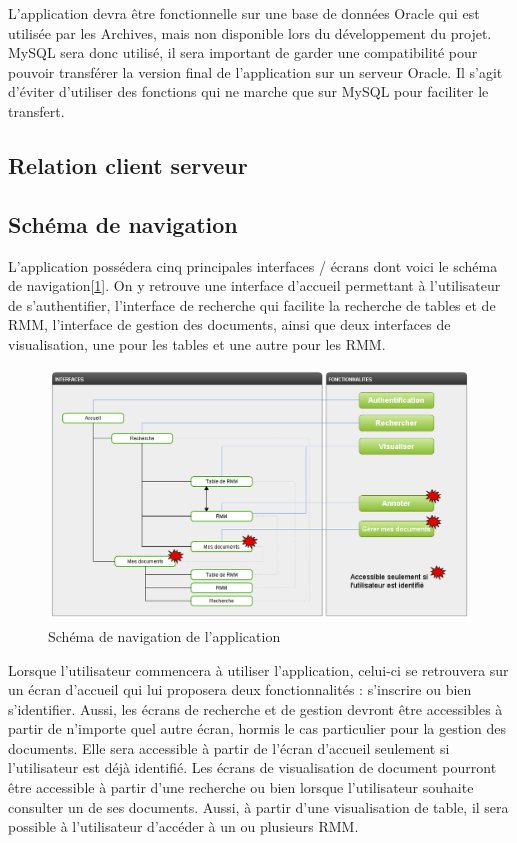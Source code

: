 \documentclass[a4paper]{article}
\begin{document}
L'application devra \^etre fonctionnelle sur une base de données Oracle qui est utilisée par les Archives, mais non disponible lors du développement du projet. MySQL sera donc utilisé, il sera important de garder une compatibilité pour pouvoir transférer la version final de l'application sur un serveur Oracle. Il s'agit d'éviter d'utiliser des fonctions qui ne marche que sur MySQL pour faciliter le transfert.
\subsection{Relation client serveur}

\subsection{Schéma de navigation}

L’application possédera cinq principales interfaces / écrans dont voici le schéma de navigation[\ref{fig:navigation}]. On y retrouve une interface d'accueil permettant à l'utilisateur de s'authentifier, l'interface de recherche qui facilite la recherche de tables et de RMM, l'interface de gestion des documents, ainsi que deux interfaces de visualisation, une pour les tables et une autre pour les RMM.

\begin{figure}[H]
\centering
\includegraphics[width=\textwidth]{navigation.png}
\caption{Schéma de navigation de l'application}
\label{fig:navigation}
\end{figure}

Lorsque l’utilisateur commencera à utiliser l’application, celui-ci se retrouvera sur un écran d’accueil qui lui proposera deux fonctionnalités : s'inscrire ou bien s’identifier. Aussi, les écrans de recherche et de gestion devront être accessibles à partir de n’importe quel autre écran, hormis le cas particulier pour la gestion des documents. Elle sera accessible à partir de l’écran d’accueil seulement si l’utilisateur est déjà identifié. Les écrans de visualisation de document pourront être accessible à partir d’une recherche ou bien lorsque l’utilisateur souhaite consulter un de ses documents. Aussi, à partir d’une visualisation de table, il sera possible à l’utilisateur d’accéder à un ou plusieurs RMM.
\end{document}
